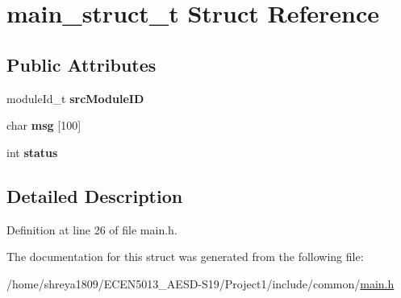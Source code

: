 \hypertarget{structmain__struct__t}{}\section{main\+\_\+struct\+\_\+t Struct Reference}
\label{structmain__struct__t}
\subsection*{Public Attributes}
\begin{DoxyCompactItemize}
\item 
\mbox{\label{structmain__struct__t_a4c52ba181aa633dd772305cfc13c3fdf}} 
module\+Id\+\_\+t {\bfseries src\+Module\+ID}
\item 
\mbox{\label{structmain__struct__t_ad4138206cfaf1bf5c314b872cb7765ef}} 
char {\bfseries msg} \mbox{[}100\mbox{]}
\item 
\mbox{\label{structmain__struct__t_a7621e814158ca8929253263df4cba606}} 
int {\bfseries status}
\end{DoxyCompactItemize}


\subsection{Detailed Description}


Definition at line 26 of file main.\+h.



The documentation for this struct was generated from the following file\+:\begin{DoxyCompactItemize}
\item 
/home/shreya1809/\+E\+C\+E\+N5013\+\_\+\+A\+E\+S\+D-\/\+S19/\+Project1/include/common/\hyperlink{main_8h}{main.\+h}\end{DoxyCompactItemize}
